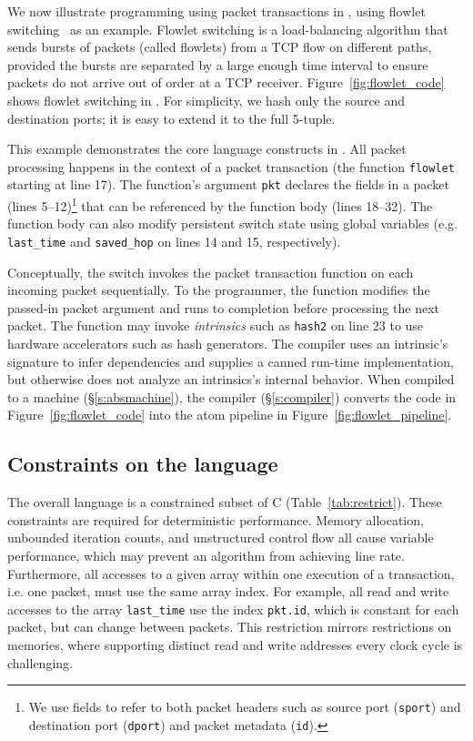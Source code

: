 We now illustrate programming using packet transactions in \pktlanguage, using
flowlet switching~\cite{flowlets} as an example. Flowlet switching is a
load-balancing algorithm that sends bursts of packets (called flowlets) from a
TCP flow on different paths, provided the bursts are separated by a large
enough time interval to ensure packets do not arrive out of order at a TCP
receiver. Figure~\ref{fig:flowlet_code} shows flowlet switching in
\pktlanguage. For simplicity, we hash only the source and destination ports; it
is easy to extend it to the full 5-tuple.

This example demonstrates the core language constructs in \pktlanguage. All
packet processing happens in the context of a packet transaction (the function
\texttt{flowlet} starting at line 17). The function's argument {\tt pkt}
declares the fields in a packet (lines 5--12)\footnote{We use fields to refer
to both packet headers such as source port ({\tt sport}) and destination port
({\tt dport}) and packet metadata ({\tt id}).} that can be referenced by the
function body (lines 18--32).  The function body can also modify persistent
switch state using global variables (e.g.  \texttt{last\_time} and
\texttt{saved\_hop} on lines 14 and 15, respectively).

Conceptually, the switch invokes the packet transaction function on each
incoming packet sequentially. To the programmer, the function modifies the
passed-in packet argument and runs to completion before processing the next
packet.  The function may invoke \textit{intrinsics} such as \texttt{hash2} on
line 23 to use hardware accelerators such as hash generators.  The \pktlanguage
compiler uses an intrinsic's signature to infer dependencies and supplies a
canned run-time implementation, but otherwise does not analyze an intrinsics's
internal behavior. When compiled to a \absmachine machine
(\S\ref{s:absmachine}), the \pktlanguage compiler (\S\ref{s:compiler}) converts
the code in Figure~\ref{fig:flowlet_code} into the atom pipeline in
Figure~\ref{fig:flowlet_pipeline}.

\subsection{Constraints on the language}
The overall language is a constrained subset of C
(Table~\ref{tab:restrict}).  These constraints are required for
deterministic performance.  Memory allocation, unbounded iteration
counts, and unstructured control flow all cause variable performance,
which may prevent an algorithm from achieving line rate.
Furthermore, all accesses to a given array within one execution of a
transaction, i.e. one packet, must use the same array index. For
example, all read and write accesses to the array \texttt{last\_time}
use the index \texttt{pkt.id}, which is constant for each packet, but
can change between packets. This restriction mirrors restrictions on
memories, where supporting distinct read and write addresses every
clock cycle is challenging.

